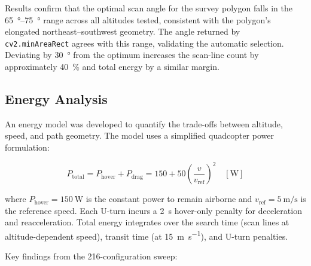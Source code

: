 Results confirm that the optimal scan angle for the survey polygon falls in the \SIrange{65}{75}{\degree} range across all altitudes tested, consistent with the polygon's elongated northeast--southwest geometry. The angle returned by \texttt{cv2.minAreaRect} agrees with this range, validating the automatic selection. Deviating by \SI{30}{\degree} from the optimum increases the scan-line count by approximately \SI{40}{\percent} and total energy by a similar margin.

\subsection{Energy Analysis}\label{sec:energy}

An energy model was developed to quantify the trade-offs between altitude, speed, and path geometry. The model uses a simplified quadcopter power formulation:

\begin{equation}\label{eq:power}
  P_{\text{total}} = P_{\text{hover}} + P_{\text{drag}} = 150 + 50 \left(\frac{v}{v_{\text{ref}}}\right)^2 \quad [\si{\watt}]
\end{equation}

\noindent where $P_{\text{hover}} = \SI{150}{\watt}$ is the constant power to remain airborne and $v_{\text{ref}} = \SI{5}{\metre\per\second}$ is the reference speed. Each U-turn incurs a \SI{2}{\second} hover-only penalty for deceleration and reacceleration. Total energy integrates over the search time (scan lines at altitude-dependent speed), transit time (at \SI{15}{\metre\per\second}), and U-turn penalties.

Key findings from the 216-configuration sweep:


